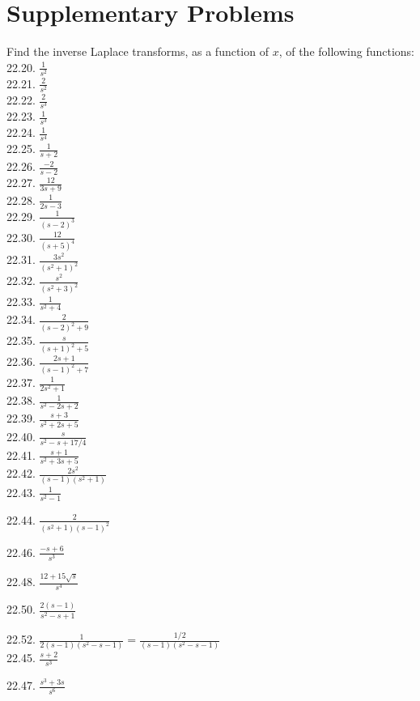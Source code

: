 \documentclass[10pt]{article}
\begin{document}
\section*{Supplementary Problems}
Find the inverse Laplace transforms, as a function of $x$, of the following functions:\\
22.20. $\frac{1}{s^{2}}$\\
22.21. $\frac{2}{s^{2}}$\\
22.22. $\frac{2}{s^{3}}$\\
22.23. $\frac{1}{s^{3}}$\\
22.24. $\frac{1}{s^{4}}$\\
22.25. $\frac{1}{s+2}$\\
22.26. $\frac{-2}{s-2}$\\
22.27. $\frac{12}{3 s+9}$\\
22.28. $\frac{1}{2 s-3}$\\
22.29. $\frac{1}{(s-2)^{3}}$\\
22.30. $\frac{12}{(s+5)^{4}}$\\
22.31. $\frac{3 s^{2}}{\left(s^{2}+1\right)^{2}}$\\
22.32. $\frac{s^{2}}{\left(s^{2}+3\right)^{2}}$\\
22.33. $\frac{1}{s^{2}+4}$\\
22.34. $\frac{2}{(s-2)^{2}+9}$\\
22.35. $\frac{s}{(s+1)^{2}+5}$\\
22.36. $\frac{2 s+1}{(s-1)^{2}+7}$\\
22.37. $\frac{1}{2 s^{2}+1}$\\
22.38. $\frac{1}{s^{2}-2 s+2}$\\
22.39. $\frac{s+3}{s^{2}+2 s+5}$\\
22.40. $\frac{s}{s^{2}-s+17 / 4}$\\
22.41. $\frac{s+1}{s^{2}+3 s+5}$\\
22.42. $\frac{2 s^{2}}{(s-1)\left(s^{2}+1\right)}$\\
22.43. $\frac{1}{s^{2}-1}$

22.44. $\frac{2}{\left(s^{2}+1\right)(s-1)^{2}}$

22.46. $\frac{-s+6}{s^{3}}$

22.48. $\frac{12+15 \sqrt{s}}{s^{4}}$

22.50. $\frac{2(s-1)}{s^{2}-s+1}$

22.52. $\frac{1}{2(s-1)\left(s^{2}-s-1\right)}=\frac{1 / 2}{(s-1)\left(s^{2}-s-1\right)}$\\
22.45. $\frac{s+2}{s^{3}}$

22.47. $\frac{s^{3}+3 s}{s^{6}}$
\end{document}
